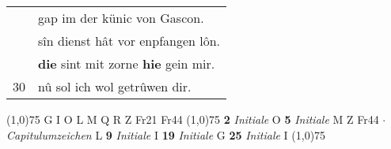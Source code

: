 \documentclass[8pt,a4paper,notitlepage]{article}
\begin{document}
\begin{table}[ht]
\begin{minipage}[t]{0.5\linewidth}
\begin{tabular}{rl}
 & gap im der künic von Gascon.\\ 
 & sîn dienst hât vor enpfangen lôn.\\ 
 & \textbf{die} sint mit zorne \textbf{hie} gein mir.\\ 
30 & nû sol ich wol getrûwen dir.\\ 
\end{tabular}
\scriptsize
\line(1,0){75} \newline
G I O L M Q R Z Fr21 Fr44 \newline
\line(1,0){75} \newline
\textbf{2} \textit{Initiale} O  \textbf{5} \textit{Initiale} M Z Fr44   $\cdot$ \textit{Capitulumzeichen} L  \textbf{9} \textit{Initiale} I  \textbf{19} \textit{Initiale} G  \textbf{25} \textit{Initiale} I  \newline
\line(1,0){75} \newline

\end{minipage}
\end{table}
\end{document}
